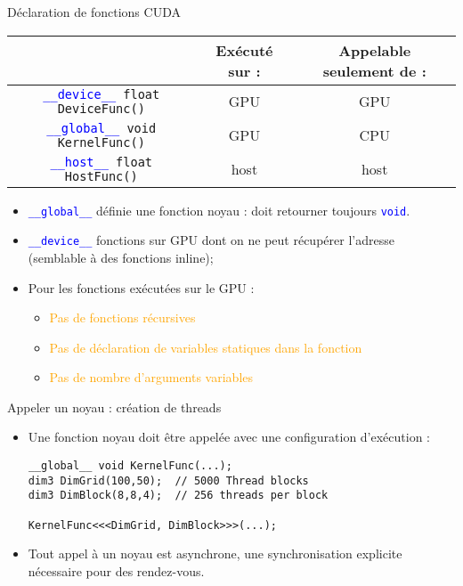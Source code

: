 \documentclass{beamer}
\begin{document}
\begin{frame}{Déclaration de fonctions CUDA}

  \begin{tabular}{|c|c|c|}\hline
 & \begin{minipage}{2cm}\small Exécuté sur :\end{minipage} & 
 \begin{minipage}{2cm}\small Appelable seulement de :\end{minipage} \\ \hline \hline
\texttt{\textcolor{blue}{\_\_device\_\_} float DeviceFunc()} &
GPU & GPU \\ \hline
\texttt{\textcolor{blue}{\_\_global\_\_} void KernelFunc()} &
GPU & CPU \\ \hline
\texttt{\textcolor{blue}{\_\_host\_\_} float HostFunc()} & host & host \\
\hline
\end{tabular}

\begin{itemize}
\item \texttt{\textcolor{blue}{\_\_global\_\_}} définie une fonction noyau :
doit retourner toujours \textcolor{blue}{\tt void}.
\item \textcolor{blue}{\tt \_\_device\_\_} fonctions sur GPU dont on ne peut
récupérer l'adresse (semblable à des fonctions inline);
\item Pour les fonctions exécutées sur le GPU :
  \begin{itemize}
  \item \textcolor{orange}{Pas de fonctions récursives}
  \item \textcolor{orange}{Pas de déclaration de variables statiques dans la fonction}
  \item \textcolor{orange}{Pas de nombre d'arguments variables}
  \end{itemize}
\end{itemize}
\end{frame}

\begin{frame}[containsverbatim]{Appeler un noyau : création de threads}

\begin{itemize}
\item Une fonction noyau doit être appelée avec une configuration d'exécution :
\begin{lstlisting}
__global__ void KernelFunc(...);
dim3 DimGrid(100,50);  // 5000 Thread blocks
dim3 DimBlock(8,8,4);  // 256 threads per block

KernelFunc<<<DimGrid, DimBlock>>>(...);
\end{lstlisting}
\item Tout appel à un noyau est asynchrone, une synchronisation
  explicite nécessaire pour des rendez-vous.
\end{itemize}
\end{frame}
\end{document}
